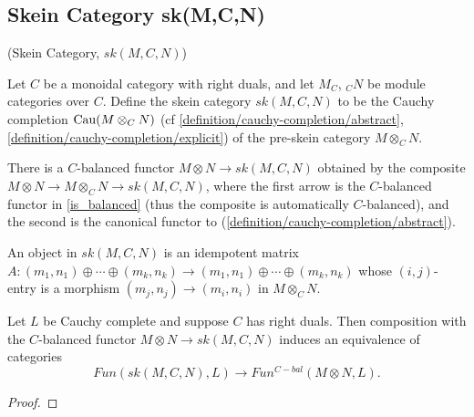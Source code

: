 \subsection{Skein Category sk(M,C,N)}

\begin{definition} (Skein Category, $sk(M,C,N)$)

  \noindent Let $C$ be a monoidal category with right duals, and let $M_C$,
  $_{C}N$ be module categories over $C$. Define the skein category $sk(M,C,N)$
  to be the Cauchy completion $\operatorname{Cau}(M \otimes_{C} N)$
  (cf \ref{definition/cauchy-completion/abstract}, \ref{definition/cauchy-completion/explicit})
  of the pre-skein category $M \otimes_{C} N$.
\end{definition}

\begin{remark}
  There is a $C$-balanced functor $M\otimes N \to sk(M,C,N)$ obtained by the
  composite $M\otimes N\to M\otimes_C N\to sk(M,C,N)$, where the first arrow
  is the $C$-balanced functor in \ref{is_balanced} (thus the composite is
  automatically $C$-balanced), and the second is the canonical functor to
  (\ref{definition/cauchy-completion/abstract}).
\end{remark}

\begin{remark}
  An object in $sk(M,C,N)$ is an idempotent matrix
  $A:(m_1,n_1)\oplus\cdots\oplus (m_k,n_k)\to (m_1,n_1)\oplus\cdots\oplus
  (m_k,n_k)$ whose $(i,j)$-entry is a morphism $(m_j,n_j)\to (m_i,n_i)$ in
  $M\otimes_C N$.
\end{remark}

\begin{proposition}\label{univ_sk}
  Let $L$ be Cauchy complete and suppose $C$ has right duals. Then composition
  with the $C$-balanced functor $M\otimes N\to sk(M,C,N)$ induces an
  equivalence of categories $$Fun(sk(M,C,N),L)\to Fun^{C-bal}(M\otimes N,L).$$
\end{proposition}

\begin{proof}
\end{proof}

